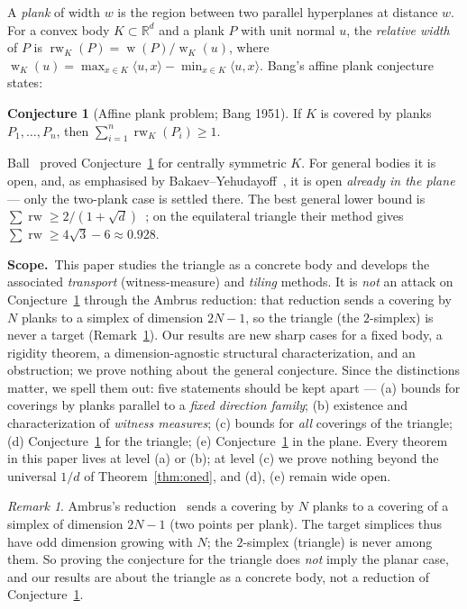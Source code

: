 \documentclass[11pt,reqno]{amsart}
\theoremstyle{plain}
\theoremstyle{definition}
\newtheorem{conjecture}[theorem]{Conjecture}
\theoremstyle{remark}
\newtheorem{remark}[theorem]{Remark}
\newcommand{\rw}{\operatorname{rw}}
\newcommand{\R}{\mathbb{R}}
\DeclareMathOperator{\wid}{w}
\begin{document}
A \emph{plank} of width $w$ is the region between two parallel hyperplanes at
distance $w$. For a convex body $K\subset\R^d$ and a plank $P$ with unit normal $u$,
the \emph{relative width} of $P$ is $\rw_K(P)=\wid(P)/\wid_K(u)$, where
$\wid_K(u)=\max_{x\in K}\langle u,x\rangle-\min_{x\in K}\langle u,x\rangle$. Bang's
affine plank conjecture~\cite{Bang51,Ambrus} states:
\begin{conjecture}[Affine plank problem; Bang 1951]\label{conj:bang}
If $K$ is covered by planks $P_1,\dots,P_n$, then $\sum_{i=1}^n \rw_K(P_i)\ge 1$.
\end{conjecture}
Ball~\cite{Ball91} proved Conjecture~\ref{conj:bang} for centrally symmetric $K$.
For general bodies it is open, and, as emphasised by Bakaev--Yehudayoff~\cite{BY26},
it is open \emph{already in the plane} --- only the two-plank case is settled there.
The best general lower bound is
$\sum\rw\ge 2/(1+\sqrt d)$~\cite{BY26}; on the equilateral triangle their method
gives $\sum\rw\ge 4\sqrt3-6\approx0.928$.

\smallskip
\noindent\textbf{Scope.}\ This paper studies the triangle as a concrete body and
develops the associated \emph{transport} (witness-measure) and \emph{tiling}
methods. It is \emph{not} an attack on Conjecture~\ref{conj:bang} through the Ambrus
reduction: that reduction sends a covering by $N$ planks to a simplex of dimension
$2N-1$, so the triangle (the $2$-simplex) is never a target
(Remark~\ref{rem:ambrus}). Our results are new sharp cases for a fixed body, a
rigidity theorem, a dimension-agnostic structural characterization, and an
obstruction; we prove nothing about the general conjecture. Since the
distinctions matter, we spell them out: five statements should be kept apart ---
(a) bounds for coverings by planks parallel to a \emph{fixed direction family};
(b) existence and characterization of \emph{witness measures}; (c) bounds for
\emph{all} coverings of the triangle; (d) Conjecture~\ref{conj:bang} for the
triangle; (e) Conjecture~\ref{conj:bang} in the plane. Every theorem in this
paper lives at level (a) or (b); at level (c) we prove nothing beyond the
universal $1/d$ of Theorem~\ref{thm:oned}, and (d), (e) remain wide open.

\begin{remark}\label{rem:ambrus}
Ambrus's reduction~\cite{Ambrus} sends a covering by $N$ planks to a covering of a
simplex of dimension $2N-1$ (two points per plank). The target simplices thus have
odd dimension growing with $N$; the $2$-simplex (triangle) is never among them. So
proving the conjecture for the triangle does \emph{not} imply the planar case, and
our results are about the triangle as a concrete body, not a reduction of
Conjecture~\ref{conj:bang}.
\end{remark}
\end{document}
